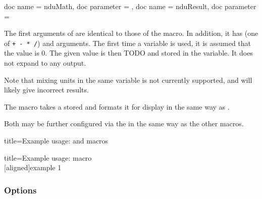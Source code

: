\documentclass{article}
\begin{document}
\begin{docCommands}[]{
	{
		doc name = nduMath,
		doc parameter = 
	},
	{
		doc name = nduResult,
		doc parameter = 
	}
}

The first arguments of  are identical to those of the  macro. In addition, it has  (one of \texttt{+ - * /}) and  arguments. The first time a variable is used, it is assumed that the value is 0. The given value is then TODO and stored in the variable. It does not expand to any output.

Note that mixing units in the same variable is not currently supported, and will likely give incorrect results.

The  macro takes a stored  and formats it for display in the same way as .

Both may be further configured via the  in the same way as the other macros.

\begin{dispExample*}{
	title=Example usage:  and  macros
}
\end{dispExample*}

\begin{dispExample*}{
	title=Example usage:  macro
}
\\
[aligned]{example 1}
\end{dispExample*}
\end{docCommands}

\clearpage
\subsubsection{Options}
\end{document}
